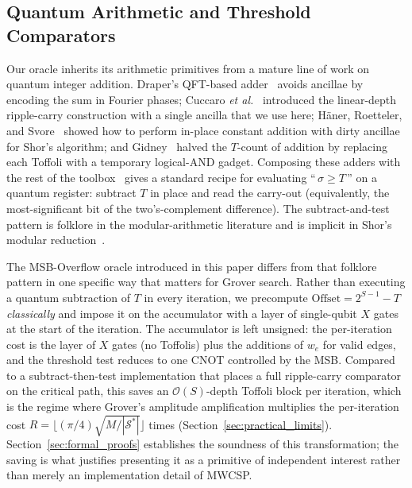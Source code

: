 \documentclass{ieeeaccess}
\begin{document}
\subsection{Quantum Arithmetic and Threshold Comparators}
\label{sec:qarith_related}
Our oracle inherits its arithmetic primitives from a mature line of work on quantum integer addition. Draper's QFT-based adder~\cite{draper2000} avoids ancillae by encoding the sum in Fourier phases; Cuccaro \textit{et al.}~\cite{cuccaro2004} introduced the linear-depth ripple-carry construction with a single ancilla that we use here; H\"aner, Roetteler, and Svore~\cite{haner2017factoring} showed how to perform in-place constant addition with dirty ancillae for Shor's algorithm; and Gidney~\cite{gidney2018halving} halved the $T$-count of addition by replacing each Toffoli with a temporary logical-AND gadget. Composing these adders with the rest of the toolbox~\cite{haner2018arithmetic,montanaro2016} gives a standard recipe for evaluating ``\,$\sigma \ge T$\,'' on a quantum register: subtract $T$ in place and read the carry-out (equivalently, the most-significant bit of the two's-complement difference). The subtract-and-test pattern is folklore in the modular-arithmetic literature and is implicit in Shor's modular reduction~\cite{haner2017factoring}.

The MSB-Overflow oracle introduced in this paper differs from that folklore pattern in one specific way that matters for Grover search. Rather than executing a quantum subtraction of $T$ in every iteration, we precompute $\mathrm{Offset} = 2^{S-1} - T$ \emph{classically} and impose it on the accumulator with a layer of single-qubit $X$ gates at the start of the iteration. The accumulator is left unsigned: the per-iteration cost is the layer of $X$ gates (no Toffolis) plus the additions of $w_e$ for valid edges, and the threshold test reduces to one CNOT controlled by the MSB. Compared to a subtract-then-test implementation that places a full ripple-carry comparator on the critical path, this saves an $\mathcal{O}(S)$-depth Toffoli block per iteration, which is the regime where Grover's amplitude amplification multiplies the per-iteration cost $R = \lfloor(\pi/4)\sqrt{M/|\mathcal{S}^*|}\rfloor$ times (Section~\ref{sec:practical_limits}). Section~\ref{sec:formal_proofs} establishes the soundness of this transformation; the saving is what justifies presenting it as a primitive of independent interest rather than merely an implementation detail of MWCSP.

\end{document}
